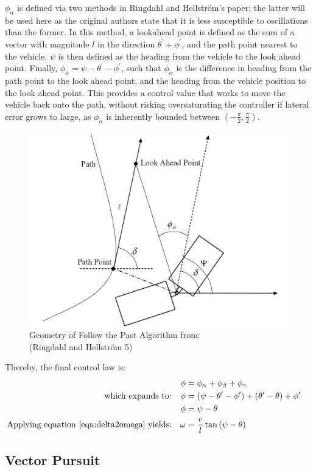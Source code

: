\documentclass[12pt]{article}
\begin{document}
\begin{flushleft}
$\phi_\alpha$ is defined via two methods in Ringdahl and Hellström's paper; the latter will be used here as the original authors state that it is less susceptible to oscillations than the former. In this method, a lookahead point is defined as the sum of a vector with magnitude $l$ in the direction $\theta^\prime+\phi^\prime$, and the path point nearest to the vehicle. $\psi$ is then defined as the heading from the vehicle to the look ahead point. Finally, $\phi_\alpha=\psi-\theta^\prime-\phi^\prime$, such that $\phi_\alpha$ is the difference in heading from the path point to the look ahead point, and the heading from the vehicle position to the look ahead point. This provides a control value that works to move the vehicle back onto the path, without risking oversaturating the controller if lateral error grows to large, as $\phi_\alpha$ is inherently bounded between $(-\frac{\pi}{2},\frac{\pi}{2})$.

\begin{figure}[H]
\includegraphics[width=0.5\linewidth]{images/RingdahlFtPDiagram}
\caption{Geometry of Follow the Past Algorithm from:\\(Ringdahl and Hellström 5)}
\label{img:ftp1}
\end{figure}

\newpage

Thereby, the final control law is:
\begin{subequations}
\begin{flalign}
&&\phi &= \phi_\alpha+\phi_\beta+\phi_\gamma &&\\
\text{which expands to:}
&&\phi &= (\psi-\theta^\prime-\phi^\prime) + (\theta^\prime-\theta) + \phi^\prime &&\\
&&\phi &= \psi-\theta &&\\
\text{Applying equation \ref{eqn:delta2omega} yields:}
&&\omega &= \frac{v}{l}\tan{(\psi-\theta)}&&
\end{flalign}
\end{subequations}


\subsection{Vector Pursuit}


\end{flushleft}
\end{document}
